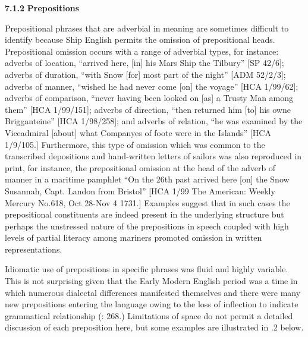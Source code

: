 \textbf{7.1.2} \textbf{Prepositions} 

Prepositional phrases that are adverbial in meaning are sometimes difficult to identify because Ship English permits the omission of prepositional heads. Prepositional omission occurs with a range of adverbial types, for instance: adverbs of location, “arrived here, [in] his Mars Ship the Tilbury” [SP 42/6]; adverbs of duration, “with Snow [for] most part of the night” [ADM 52/2/3]; adverbs of manner, “wished he had never come [on] the voyage” [HCA 1/99/62]; adverbs of comparison, “never having been looked on [as] a Trusty Man among them” [HCA 1/99/151]; adverbs of direction, “then returned him [to] his owne Brigganteine” [HCA 1/98/258]; and adverbs of relation, “he was examined by the Viceadmiral [about] what Companyes of foote were in the Islands” [HCA 1/9/105.] Furthermore, this type of omission which was common to the transcribed depositions and hand-written letters of sailors was also reproduced in print, for instance, the prepositional omission at the head of the adverb of manner in a maritime pamphlet “On the 26th past arrived here [on] the Snow Susannah, Capt. Landon from Bristol” [HCA 1/99 The American: Weekly Mercury No.618, Oct 28-Nov 4 1731.] Examples suggest that in such cases the prepositional constituents are indeed present in the underlying structure but perhaps the unstressed nature of the prepositions in speech coupled with high levels of partial literacy among mariners promoted omission in written representations. 

  Idiomatic use of prepositions in specific phrases was fluid and highly variable. This is not surprising given that the Early Modern English period was a time in which numerous dialectal differences manifested themselves and there were many new prepositions entering the language owing to the loss of inflection to indicate grammatical relationship (\citealt{MillwardHayes2012}: 268.) Limitations of space do not permit a detailed discussion of each preposition here, but some examples are illustrated in .2 below. 

\tablefirsthead{}

